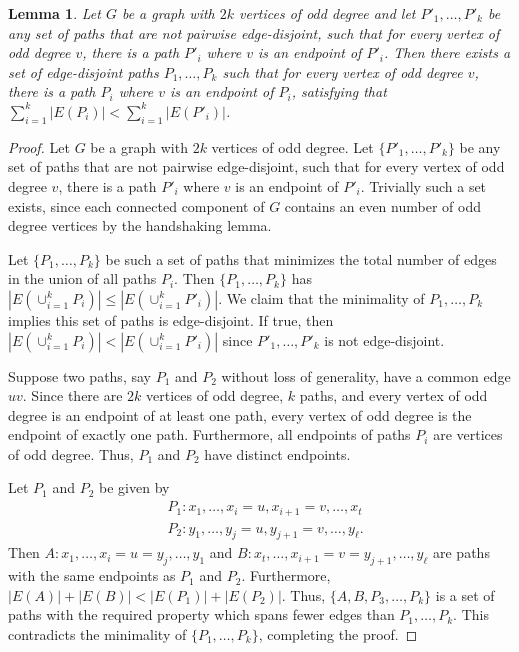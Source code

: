 \documentclass[11pt]{amsart}
\newtheorem{lemma}[theorem]{Lemma}
\theoremstyle{definition}
\begin{document}
\begin{lemma}\label{Lemma: general odd paths}
    Let $G$ be a graph with $2k$ vertices of odd degree and let $P'_1,\dots, P'_k$ 
    be any set of paths that are not pairwise edge-disjoint, 
    such that for every vertex of odd degree $v$, there is a path $P'_i$ where $v$ is an endpoint of $P'_i$.
    Then there exists a set of edge-disjoint paths $P_1,\dots, P_k$
    such that for every vertex of odd degree $v$, 
    there is a path $P_i$ where $v$ is an endpoint of $P_i$,
    satisfying that $\sum_{i=1}^k |E(P_i)| <  \sum_{i=1}^k |E(P'_i)|$.
\end{lemma}


\begin{proof}
    Let $G$ be a graph with $2k$ vertices of odd degree.
    Let $\{P'_1,\dots, P'_k\}$ 
    be any set of paths that are not pairwise edge-disjoint, 
    such that for every vertex of odd degree $v$, there is a path $P'_i$ where $v$ is an endpoint of $P'_i$.
    Trivially such a set exists, since each connected component of $G$ contains an even number of odd degree vertices by the handshaking lemma.

    Let
    $\{P_1,\dots, P_k\}$ be such  a set of paths
    that minimizes the total number of edges in the union of all paths $P_i$.
    Then $\{P_1,\dots, P_k\}$ has  $|E(\cup_{i=1}^k P_i)| \leq  |E(\cup_{i=1}^k P'_i)| $.
    We claim that the minimality of $P_1,\dots, P_k$ implies this set of paths is edge-disjoint.
    If true, then $|E(\cup_{i=1}^k P_i)| <  |E(\cup_{i=1}^k P'_i)| $ since  $P'_1,\dots, P'_k$ is not edge-disjoint.

    Suppose two paths, say $P_1$ and $P_2$ without loss of generality, have a common edge $uv$.
    Since there are $2k$ vertices of odd degree, $k$ paths, and every vertex of odd degree is an endpoint of at least one path,
    every vertex of odd degree is the endpoint of exactly one path.
    Furthermore, all endpoints of paths $P_i$ are vertices of odd degree.
    Thus, $P_1$ and $P_2$ have distinct endpoints.
    
    Let $P_1$ and $P_2$ be given by
\begin{align*}
    &P_1: x_1,\dots, x_i = u,x_{i+1} = v, \dots, x_t \\
    &P_2: y_1,\dots, y_j = u,y_{j+1} = v, \dots, y_\ell.
\end{align*}
    Then $A: x_1,\dots, x_{i} = u = y_j, \dots, y_1$ and $B: x_t,\dots, x_{i+1} = v = y_{j+1}, \dots, y_\ell$ are paths with the same endpoints as $P_1$ and $P_2$.
    Furthermore, $|E(A)|+|E(B)| < |E(P_1)|+|E(P_2)|$.
    Thus, $\{A,B,P_3,\dots, P_k\}$ is a set of paths with the required property which spans fewer edges than $P_1,\dots, P_k$.
    This contradicts the minimality of $\{P_1,\dots, P_k\}$,
    completing the proof.
\end{proof}
\end{document}
